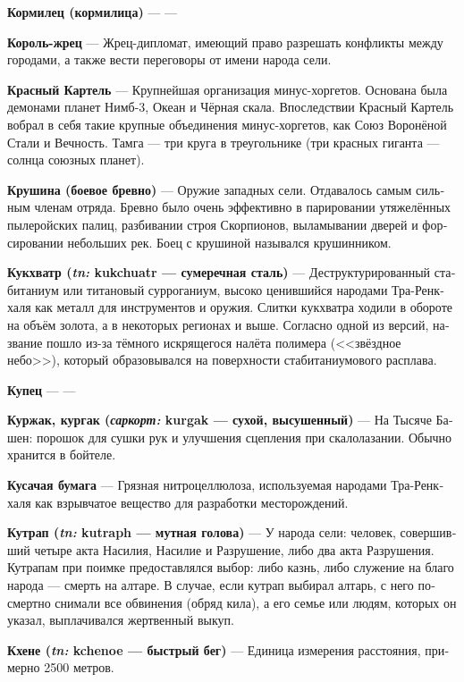 \documentclass[a4paper,12pt,fleqn]{book}\usepackage{polyglossia}\setdefaultlanguage[babelshorthands=true]{russian}\setotherlanguage{english}\defaultfontfeatures{Ligatures=TeX,Mapping=tex-text}\usepackage{xcolor}\newcommand{\ml}[3]{#2}
\newcommand{\theterm}[3]{\textbf{\hypertarget{#1}{#2}} --- #3}
\newcommand{\theorigin}[3]{\textit{#1:} #2 --- #3}
\begin{document}
{\theterm{nurse}
{Кормилец (кормилица)}
{---}

\theterm{priest-king} %
{Король-жрец}
{Жрец-дипломат, имеющий право разрешать конфликты между городами, а также вести переговоры от имени народа сели.}

\theterm{scarlett-cartel} %
{Красный Картель}
{Крупнейшая организация минус-хоргетов.
Основана была демонами планет Нимб-3, Океан и Чёрная скала.
Впоследствии Красный Картель вобрал в себя такие крупные объединения минус-хоргетов, как Союз Воронёной Стали и Вечность.
Тамга --- три круга в треугольнике (три красных гиганта --- солнца союзных планет).}

\theterm{crushwood}
{Крушина (боевое бревно)} %
{Оружие западных сели.
Отдавалось самым сильным членам отряда.
Бревно было очень эффективно в парировании утяжелённых пылеройских палиц, разбивании строя Скорпионов, выламывании дверей и форсировании небольших рек.
Боец с крушиной назывался крушинником. %
}

\theterm{kukchuatr}
{Кукхватр (\theorigin{tn}{kukchuatr}{сумеречная сталь})}
{Деструктурированный стабитаниум или титановый сурроганиум, высоко ценившийся народами Тра-Ренкхаля как металл для инструментов и оружия.
Слитки кукхватра ходили в обороте на объём золота, а в некоторых регионах и выше.
Согласно одной из версий, название пошло из-за тёмного искрящегося налёта полимера (<<звёздное небо>>), который образовывался на поверхности стабитаниумового расплава.}

\theterm{trader} %
{Купец}
{---}

\theterm{kurschack}
{Куржак, кургак (\theorigin{саркорт}{kurgak}{сухой, высушенный})}
{На Тысяче Башен: порошок для сушки рук и улучшения сцепления при скалолазании.
Обычно хранится в бойтеле.}

\theterm{biting-paper} %
{Кусачая бумага}
{Грязная нитроцеллюлоза, используемая народами Тра-Ренкхаля как взрывчатое вещество для разработки месторождений.}

\theterm{kutraph}
{Кутрап (\theorigin{tn}{kutraph}{мутная голова})}
{У народа сели: человек, совершивший четыре акта Насилия, Насилие и Разрушение, либо два акта Разрушения.
Кутрапам при поимке предоставлялся выбор: либо казнь, либо служение на благо народа --- смерть на алтаре.
В случае, если кутрап выбирал алтарь, с него посмертно снимали все обвинения (обряд кила), а его семье или людям, которых он указал, выплачивался жертвенный выкуп.}

\theterm{kchenoe-distance}
{Кхене (\theorigin{tn}{kchenoe}{быстрый бег})}
{Единица измерения расстояния, примерно 2500 метров.}

}
\end{document}
